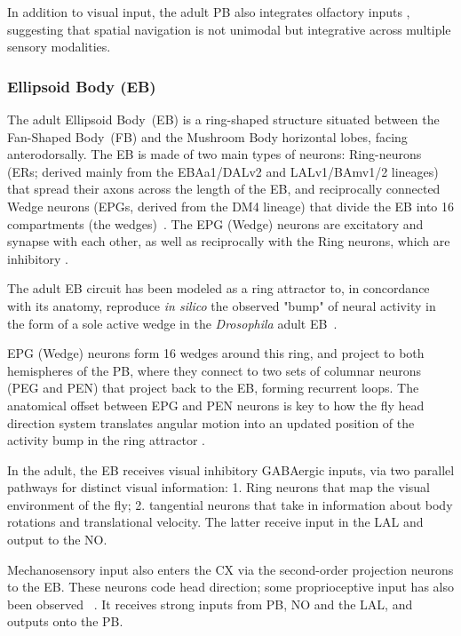         In addition to visual input, the adult PB also integrates olfactory inputs \citep{hulse2021connectome}, suggesting that spatial navigation is not unimodal but integrative across multiple sensory modalities.
        \subsubsection{Ellipsoid Body (EB)}
        The adult Ellipsoid Body~(EB) is a ring-shaped structure situated between the Fan-Shaped Body~(FB) and the Mushroom Body horizontal lobes, facing anterodorsally.
        The EB is made of two main types of neurons: Ring-neurons (ERs; derived mainly from the EBAa1/DALv2 and LALv1/BAmv1/2 lineages) that spread their axons across the length of the EB, and reciprocally connected Wedge neurons (EPGs, derived from the DM4 lineage) that divide the EB into 16 compartments (the wedges)~\citep{wolff2015neuroarchitecture}.
        The EPG (Wedge) neurons are excitatory and synapse with each other, as well as reciprocally with the Ring neurons, which are inhibitory \citep{franconville2018building, hulse2021connectome}.

        The adult EB circuit has been modeled as a ring attractor \citep{Stone2017CXModel} to, in concordance with its anatomy, reproduce \textit{in silico} the observed "bump" of neural activity in the form of a sole active wedge in the \textit{Drosophila} adult EB~\citep{seelig2015neural}.

        EPG (Wedge) neurons form 16 wedges around this ring, and project to both hemispheres of the PB, where they connect to two sets of columnar neurons (PEG and PEN) that project back to the EB, forming recurrent loops.
        The anatomical offset between EPG and PEN neurons is key to how the fly head direction system translates angular motion into an updated position of the activity bump in the ring attractor \citep{Stone2017CXModel}.

        In the adult, the EB receives visual inhibitory GABAergic inputs, via two parallel pathways for distinct visual information: 1. Ring neurons that map the visual environment of the fly; 2. tangential neurons that take in information about body rotations and translational velocity. The latter receive input in the LAL and output to the NO.

        Mechanosensory input also enters the CX via the second-order projection neurons to the EB. These neurons code head direction; some proprioceptive input has also been observed ~\citep{hulse2021connectome}. It receives strong inputs from PB, NO and the LAL, and outputs onto the PB.

